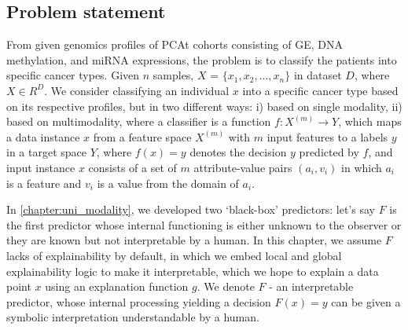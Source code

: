 \iffalse
\subsection{Problem statement}
From given genomics profiles of PCAt cohorts consisting of GE, DNA methylation, and miRNA expressions, the problem is to classify the patients into specific cancer types. Given $n$ samples, $X$ = ${{\{x_1,x_2, ..., x_n}}\}$ in dataset $D$, where $X \in {R}^{D}$. We consider classifying an individual $x$ into a specific cancer type based on its respective profiles, but in two different ways: i) based on single modality, ii) based on multimodality, where a  classifier is a function $f: {X}^{(m)} \rightarrow {Y}$, which maps a data instance $x$ from a feature space ${X}^{(m)}$ with $m$ input features to a labels $y$ in a target space ${Y}$, where $f(x)=y$ denotes the decision $y$ predicted by $f$, and input instance $x$ consists of a set of $m$ attribute-value pairs $\left(a_{i}, v_{i}\right)$ in which $a_i$ is a feature and $v_i$ is a value from the domain of $a_i$. 

\hspace*{3.5mm} In \cref{chapter:uni_modality}, we developed two `black-box' predictors: let's say $F$ is the first predictor whose internal functioning is either unknown to the observer or they are known but not interpretable by a human. In this chapter, we assume $F$ lacks of explainability by default, in which we embed local and global explainability logic to make it interpretable, which we hope to explain a data point $x$ using an explanation function $g$. We denote ${F}$ - an interpretable predictor, whose internal processing yielding a decision ${F}(x)=y$ can be given a symbolic interpretation understandable by a human. 

